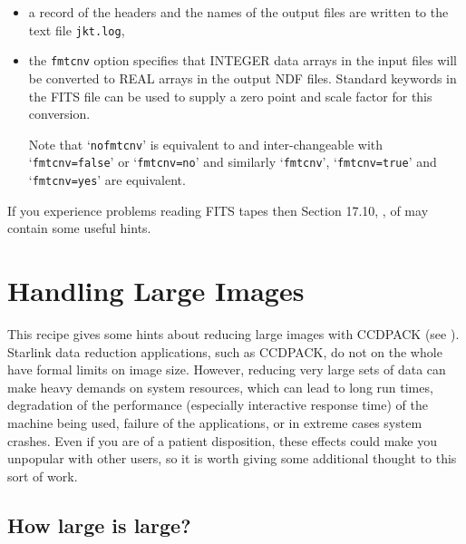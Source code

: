 \documentclass[twoside,11pt]{starlink}
\begin{document}
\begin{description}
\begin{itemize}
    \item a record of the headers and the names of the output files are
     written to the text file \texttt{jkt.log},

    \item the \texttt{fmtcnv} option specifies that INTEGER data arrays
     in the input files will be converted to REAL arrays in the output
     NDF files.  Standard keywords in the FITS file can be used to supply
     a zero point and scale factor for this conversion.

     Note that `\texttt{nofmtcnv}' is equivalent to and inter-changeable with
     `\texttt{fmtcnv=false}' or `\texttt{fmtcnv=no}' and similarly `\texttt{fmtcnv}',
     `\texttt{fmtcnv=true}' and `\texttt{fmtcnv=yes}' are equivalent.

  \end{itemize}

\end{description}

If you experience problems reading FITS tapes then Section 17.10,
,
of \/\cite{SUN95} may contain some useful hints.


\newpage
\section{\label{LARGE}Handling Large Images}


This recipe gives some hints about reducing large images with CCDPACK
(see \/\cite{SUN139}).
Starlink data reduction applications, such as CCDPACK, do not on the whole
have formal limits on image size.  However,
reducing very large sets of data can make heavy demands
on system resources, which
can lead to long run times, degradation of the performance
(especially interactive response time)
of the machine being used,
failure of the applications,
or in extreme cases system crashes.
Even if you are of a patient disposition,
these effects could make you unpopular with other users,
so it is worth giving some additional thought to this sort of work.

\subsection{How large is large?}
\end{document}
